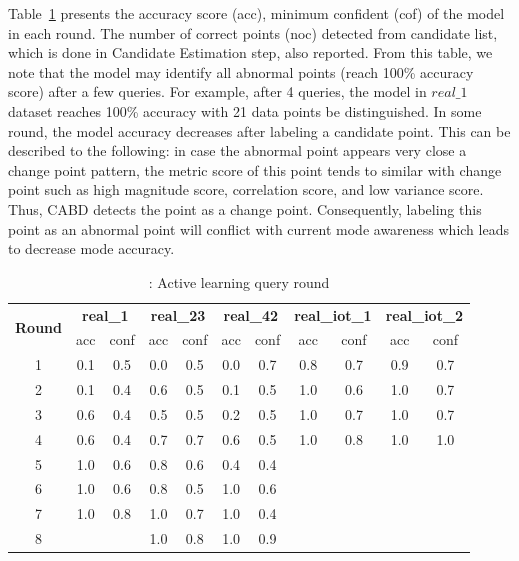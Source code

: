 Table~\ref{tab:AL_queryrounds} presents the accuracy score (acc), minimum confident (cof) of the model in each round. The number of correct points (noc) detected from candidate list, which is done in Candidate Estimation step, also reported. From this table, we note that the model may identify all abnormal points (reach 100\% accuracy score) after a few queries.  For example, after 4 queries, the model in $ real\_1 $ dataset reaches 100\% accuracy with 21 data points be distinguished. In some round, the model accuracy decreases after labeling a candidate point. This can be described to the following: in case the abnormal point appears very close a change point pattern, the metric score of this point tends to similar with change point such as high magnitude score, correlation score, and low variance score. Thus, CABD detects the point as a change point. Consequently, labeling this point as an abnormal point will conflict with current mode awareness which leads to decrease mode accuracy. 

\begin{table}[ht]
  \centering
  \small{
        \setlength\tabcolsep{3pt}
        \begin{tabular}{|c|c|c|c|c|c|c|c|c|c|c|}
        \toprule
        \multirow{2}[4]{*}{\textbf{Round}} & \multicolumn{2}{c|}{\textbf{real\_1}} & \multicolumn{2}{c|}{\textbf{real\_23}} & \multicolumn{2}{c|}{\textbf{real\_42}} & \multicolumn{2}{c|}{\textbf{real\_iot\_1}} & \multicolumn{2}{c|}{\textbf{real\_iot\_2}} \\
    \cmidrule{2-11}          & acc   & conf  & acc   & conf  & acc   & conf  & acc   & conf  & acc   & conf \\
        \midrule
        1     & 0.1   & 0.5   & 0.0   & 0.5   & 0.0   & 0.7   & 0.8   & 0.7   & 0.9   & 0.7 \\
        \midrule
        2     & 0.1   & 0.4   & 0.6   & 0.5   & 0.1   & 0.5   & 1.0   & 0.6   & 1.0   & 0.7 \\
        \midrule
        3     & 0.6   & 0.4   & 0.5   & 0.5   & 0.2   & 0.5   & 1.0   & 0.7   & 1.0   & 0.7 \\
        \midrule
        4     & 0.6   & 0.4   & 0.7   & 0.7   & 0.6   & 0.5   & 1.0   & 0.8   & 1.0   & 1.0 \\
        \midrule
        5     & 1.0   & 0.6   & 0.8   & 0.6   & 0.4   & 0.4   &       &       &       &  \\
        \midrule
        6     & 1.0   & 0.6   & 0.8   & 0.5   & 1.0   & 0.6   &       &       &       &  \\
        \midrule
        7     & 1.0   & 0.8   & 1.0   & 0.7   & 1.0   & 0.4   &       &       &       &  \\
        \midrule
        8     &       &       & 1.0   & 0.8   & 1.0   & 0.9   &       &       &       &  \\
        \bottomrule
        \end{tabular}%
      \caption{: Active learning query round}
	\label{tab:AL_queryrounds}%
  }
\end{table}%

